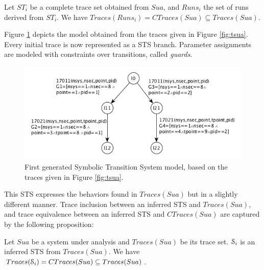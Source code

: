 \begin{proposition}
    Let $ST_i$ be a complete trace set obtained from
    $\mathit{Sua}$, and $Runs_i$ the set of runs derived from
    $ST_i$.
    We have $Traces(Runs_i) = CTraces(Sua) \subseteq Traces(Sua)$.

    \label{}
\end{proposition}

Figure \ref{fig:firstmodel} depicts the model obtained from the
traces given in Figure \ref{fig:tsua}. Every initial trace is now
represented as a STS branch. Parameter assignments are modeled
with constraints over transitions, called \textit{guards}.

\begin{figure}[ht]
    \begin{center}
        \includegraphics[width=1.0\linewidth]{figures/STS1.png}
    \end{center}

  \caption{First generated Symbolic Transition System model,
  based on the traces given in Figure \ref{fig:tsua}.}
  \label{fig:firstmodel}
\end{figure}

This STS expresses the behaviors found in $Traces(Sua)$ but in a
slightly different manner. Trace inclusion \cite{petrenko06}
between an inferred STS and $Traces(Sua)$, and trace equivalence
\cite{petrenko06} between an inferred STS and $CTraces(Sua)$ are
captured by the following proposition:

\begin{proposition}
    Let $\mathit{Sua}$ be a system under analysis and $Traces(Sua)$ be its
    trace set. $\EuScript{S}_i$ is an inferred STS from
    $Traces(Sua)$.
    We have $Traces(\EuScript{S}_i) = CTraces(Sua) \subseteq Traces(Sua)$.

	\label{def:equivtraces_IOSTS}
\end{proposition}


